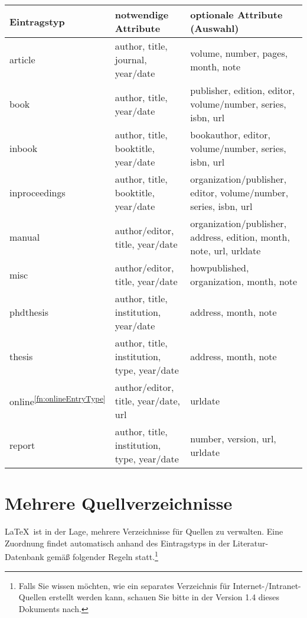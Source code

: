 \begin{tabular}{l|p{6cm}|p{6cm}}
\textbf{Eintragstyp} & \textbf{notwendige Attribute} & \textbf{optionale Attribute (Auswahl)} \\
\hline
article & author, title, journal, year/date  & volume, number, pages, month, note \\
\hline
book & author, title, year/date  & publisher, edition, editor, \mbox{volume/number}, series, isbn, url \\
\hline
inbook & author, title, booktitle, year/date  & bookauthor, editor, volume/number, series, isbn, url \\
\hline
inproceedings & author, title, booktitle, year/date  & organization/publisher, editor, volume/number, series, isbn, url  \\
\hline
manual & author/editor, title, year/date  & organization/publisher, address, edition, month, note, url, urldate \\
\hline
misc & author/editor, title, year/date & howpublished, organization, month, note \\
\hline
phdthesis & author, title, institution, year/date  & address, month, note \\
\hline
thesis & author, title, institution, type, year/date &  address, month, note \\
\hline
online\textsuperscript{\ref{fn:onlineEntryType}} & author/editor, title, year\footnotemark/date, url & urldate \\
\hline
report & author, title, institution, type, year/date & number, version, url, urldate \\
\end{tabular}



\section{Mehrere Quellverzeichnisse}

\LaTeX\ ist in der Lage, mehrere Verzeichnisse für Quellen zu verwalten. Eine Zuordnung findet automatisch anhand des Eintragstyps in der Literatur-Datenbank gemäß folgender Regeln statt.\footnote{Falls Sie wissen möchten, wie ein separates Verzeichnis für Internet-/Intranet-Quellen erstellt werden kann, schauen Sie bitte in der Version 1.4 dieses Dokuments nach.}

